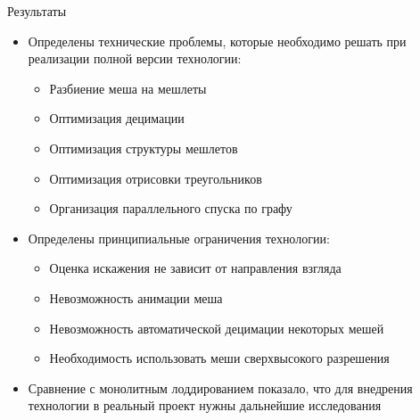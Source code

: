 \begin{frame}{Результаты}
    \begin{itemize}
        \item Определены технические проблемы, которые необходимо решать при реализации полной версии технологии:
        \begin{itemize}
            \item Разбиение меша на мешлеты
            \item Оптимизация децимации
            \item Оптимизация структуры мешлетов
            \item Оптимизация отрисовки треугольников
            \item Организация параллельного спуска по графу
        \end{itemize}
        \item Определены принципиальные ограничения технологии:
        \begin{itemize}
            \item Оценка искажения не зависит от направления взгляда
            \item Невозможность анимации меша
            \item Невозможность автоматической децимации некоторых мешей
            \item Необходимость использовать меши сверхвысокого разрешения
        \end{itemize}
        \item Сравнение с монолитным лоддированием показало, что для внедрения технологии в реальный проект нужны дальнейшие исследования
    \end{itemize}
\end{frame}
